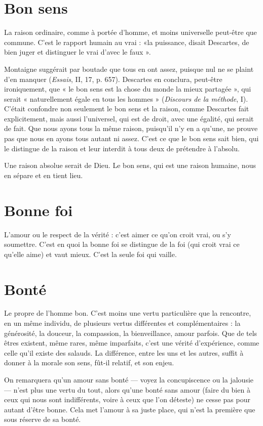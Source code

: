 \section{Bon sens}
La raison ordinaire, comme à portée d’homme, et moins universelle
peut-être que commune. C’est le rapport humain au vrai :
«la puissance, disait Descartes, de bien juger et distinguer le vrai d’avec le
faux ».

Montaigne suggérait par boutade que tous en ont assez, puisque nul ne se
plaint d'en manquer ({\it Essais}, II, 17, p. 657). Descartes en conclura, peut-être
ironiquement, que « le bon sens est la chose du monde la mieux partagée », qui
serait « naturellement égale en tous les hommes » ({\it Discours de la méthode}, I).
C'était confondre non seulement le bon sens et la raison, comme Descartes fait
explicitement, mais aussi l’universel, qui est de droit, avec une égalité, qui serait
de fait. Que nous ayons tous la même raison, puisqu'il n’y en a qu’une, ne
prouve pas que nous en ayons tous autant ni assez. C’est ce que le bon sens sait
bien, qui le distingue de la raison et leur interdit à tous deux de prétendre à
l'absolu.

Une raison absolue serait de Dieu. Le bon sens, qui est une raison
humaine, nous en sépare et en tient lieu.

\section{Bonne foi}
L’amour ou le respect de la vérité : c’est aimer ce qu’on croit
vrai, ou s’y soumettre. C’est en quoi la bonne foi se distingue
de la foi (qui croit vrai ce qu’elle aime) et vaut mieux. C’est la seule foi qui
vaille.

\section{Bonté}
Le propre de l’homme bon. C’est moins une vertu particulière que
la rencontre, en un même individu, de plusieurs vertus différentes
et complémentaires : la générosité, la douceur, la compassion, la bienveillance,
amour parfois. Que de tels êtres existent, même rares, même imparfaits,
c’est une vérité d'expérience, comme celle qu’il existe des salauds. La différence,
entre les uns et les autres, suffit à donner à la morale son sens, fût-il relatif, et
son enjeu.

On remarquera qu’un amour sans bonté — voyez la concupiscence ou la
jalousie — n’est plus une vertu du tout, alors qu’une bonté sans amour (faire du
bien à ceux qui nous sont indifférents, voire à ceux que l’on déteste) ne cesse
pas pour autant d’être bonne. Cela met l’amour à sa juste place, qui n’est la
première que sous réserve de sa bonté.

